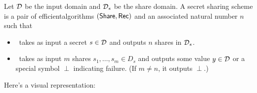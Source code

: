\begin{definition}\label{def:ss}
    Let $\mathcal{D}$ be the input domain and $\mathcal{D}_s$ be the share domain.
    A secret sharing scheme is a pair of efficient\footnotemark algorithms 
    $(\mathsf{Share}, \mathsf{Rec})$ and an associated natural number $n$ such that

    \begin{itemize}
        \item \share~takes as input a secret $s \in \mathcal{D}$ and outputs $n$ 
        shares in $\mathcal{D}_s$.
        \item \rec~takes as input $m$ shares $s_1, \ldots, s_m \in D_s$ 
        and outputs some value $y \in \mathcal{D}$ or a special symbol $\perp$ 
        indicating failure. (If $m \neq n$, it outputs $\perp$.)
    \end{itemize}
\end{definition}


Here's a visual representation: 

